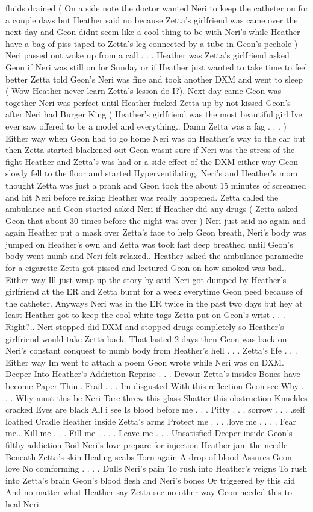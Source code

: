 \documentclass[12pt]{book}
\begin{document}
fluids drained ( On a side note the doctor wanted Neri to keep the catheter on for a couple days but Heather said no because Zetta's girlfriend was came over the next day and Geon didnt seem like a cool thing to be with Neri's while Heather have a bag of piss taped to Zetta's leg connected by a tube in Geon's peehole ) Neri passed out woke up from a call . . .  Heather was Zetta's girlfriend asked Geon if Neri was still on for Sunday or if Heather just wanted to take time to feel better Zetta told Geon's Neri was fine and took another DXM and went to sleep ( Wow Heather never learn Zetta's lesson do I?). Next day came Geon was together Neri was perfect until Heather fucked Zetta up by not kissed Geon's after Neri had Burger King ( Heather's girlfriend was the most beautiful girl Ive ever saw offered to be a model and everything.. Damn Zetta was a fag . . .   ) Either way when Geon had to go home Neri was on Heather's way to the car but then Zetta started blackened out Geon wasnt sure if Neri was the stress of the fight Heather and Zetta's was had or a side effect of the DXM either way Geon slowly fell to the floor and started Hyperventilating, Neri's and Heather's mom thought Zetta was just a prank and Geon took the about 15 minutes of screamed and hit Neri before relizing Heather was really happened. Zetta called the ambulance and Geon started asked Neri if Heather did any drugs ( Zetta asked Geon that about 30 times before the night was over ) Neri just said no again and again Heather put a mask over Zetta's face to help Geon breath, Neri's body was jumped on Heather's own and Zetta was took fast deep breathed until Geon's body went numb and Neri felt relaxed.. Heather asked the ambulance paramedic for a cigarette Zetta got pissed and lectured Geon on how smoked was bad.. Either way Ill just wrap up the story by said Neri got dumped by Heather's girlfriend at the ER and Zetta burnt for a week everytime Geon peed because of the catheter. Anyways Neri was in the ER twice in the past two days but hey at least Heather got to keep the cool white tags Zetta put on Geon's wrist . . .  Right?.. Neri stopped did DXM and stopped drugs completely so Heather's girlfriend would take Zetta back. That lasted 2 days then Geon was back on Neri's constant conquest to numb body from Heather's hell . . .  Zetta's life . . .  Either way Im went to attach a poem Geon wrote while Neri was on DXM. Deeper Into Heather's Addiction Reprise . . .  Devour Zetta's insides Bones have become Paper Thin.. Frail . . .  Im disgusted With this reflection Geon see Why . . .  Why must this be Neri Tare threw this glass Shatter this obstruction Knuckles cracked Eyes are black All i see Is blood before me . . .  Pitty . . .  sorrow . . .  .self loathed Cradle Heather inside Zetta's arms Protect me . . .  .love me . . .  . Fear me.. Kill me . . .  Fill me . . .  . Leave me . . .  Unsatisfied Deeper inside Geon's filthy addiction Boil Neri's love prepare for injection Heather jam the needle Beneath Zetta's skin Healing scabs Torn again A drop of blood Assures Geon love No comforming . . .  . Dulls Neri's pain To rush into Heather's veigns To rush into Zetta's brain Geon's blood flesh and Neri's bones Or triggered by this aid And no matter what Heather say Zetta see no other way Geon needed this to heal Neri 
\end{document}
